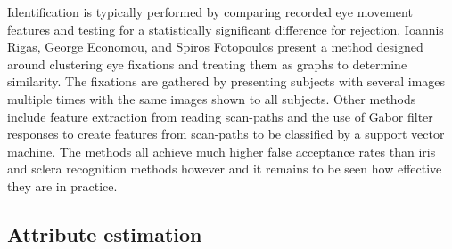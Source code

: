 Identification is typically performed by comparing recorded eye movement features and testing for a statistically significant difference for rejection. Ioannis Rigas, George Economou, and Spiros Fotopoulos \cite{rigasBiometricIdentificationBased2012} present a method designed around clustering eye fixations and treating them as graphs to determine similarity. The fixations are gathered by presenting subjects with several images multiple times with the same images shown to all subjects. Other methods include feature extraction from reading scan-paths \cite{hollandBiometricIdentificationEye2011, bednarikEyeMovementsBiometric2005} and the use of Gabor filter responses to create features from scan-paths to be classified by a support vector machine\cite{liBiometricRecognitionTexture2018}. The methods all achieve much higher false acceptance rates than iris and sclera recognition methods however and it remains to be seen how effective they are in practice.

\subsection{Attribute estimation}















